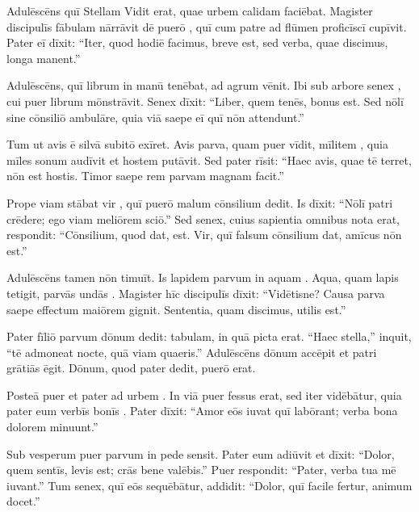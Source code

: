 \documentclass[12pt]{nextbook}
\begin{document}
\begin{readersection}{Adulēscēns quī Stellam Vidit}
 erat, quae urbem calidam faciēbat. Magister discipulīs fābulam nārrāvit dē puerō , quī cum patre ad flūmen proficīscī cupīvit. Pater eī dīxit: “Iter, quod hodiē facimus, breve est, sed verba, quae discimus, longa manent.”

Adulēscēns, quī librum in manū tenēbat, ad agrum vēnit. Ibi sub arbore senex , cui puer librum mōnstrāvit. Senex dīxit: “Liber, quem tenēs, bonus est. Sed nōlī sine cōnsiliō ambulāre, quia viā saepe  eī quī nōn attendunt.”

Tum  ut avis ē silvā subitō exīret. Avis parva, quam puer vīdit, mīlitem , quia mīles sonum audīvit et hostem putāvit. Sed pater rīsit: “Haec avis, quae tē terret, nōn est hostis. Timor saepe rem parvam magnam facit.”

Prope viam stābat vir , quī puerō malum cōnsilium dedit. Is dīxit: “Nōlī patri crēdere; ego viam meliōrem sciō.” Sed senex, cuius sapientia omnibus nota erat, respondit: “Cōnsilium, quod dat,  est. Vir, quī falsum cōnsilium dat, amīcus nōn est.”

Adulēscēns tamen nōn timuīt. Is lapidem parvum in aquam . Aqua, quam lapis tetigit, parvās undās . Magister hīc discipulīs dīxit: “Vidētisne? Causa parva saepe effectum maiōrem gignit. Sententia, quam discimus, utilis est.”

Pater fīliō parvum dōnum dedit: tabulam, in quā  picta erat. “Haec stella,” inquit, “tē admoneat nocte, quā viam quaeris.” Adulēscēns dōnum accēpit et patri grātiās ēgit. Dōnum, quod pater dedit, puerō  erat.

Posteā puer et pater ad urbem . In viā puer fessus erat, sed iter  vidēbātur, quia pater eum verbīs bonīs . Pater dīxit: “Amor eōs iuvat quī labōrant; verba bona dolorem minuunt.”

Sub vesperum puer parvum  in pede sensit. Pater eum adiūvit et dīxit: “Dolor, quem sentīs, levis est; crās bene valēbis.” Puer respondit: “Pater, verba tua mē iuvant.” Tum senex, quī eōs sequēbātur, addidit: “Dolor, quī facile fertur, animum docet.”


\end{readersection}
\end{document}

